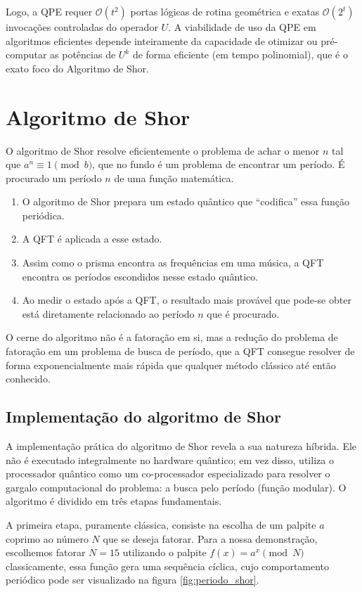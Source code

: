 \documentclass[12pt, a4paper]{article}
\begin{document}
Logo, a QPE requer $\mathcal{O}(t^2)$ portas lógicas de rotina geométrica e exatas $\mathcal{O}(2^t)$ invocações controladas do operador $U$. A viabilidade de uso da QPE em algoritmos eficientes depende inteiramente da capacidade de otimizar ou pré-computar as potências de $U^k$ de forma eficiente (em tempo polinomial), que é o exato foco do Algoritmo de Shor.

\section{Algoritmo de Shor}

O algoritmo de Shor resolve eficientemente o problema de achar o menor $n$ tal que $a^n \equiv 1 \pmod{b}$, que no fundo é um problema de encontrar um período. É procurado um período $n$ de uma função matemática.
\begin{enumerate}
    \item O algoritmo de Shor prepara um estado quântico que ``codifica'' essa função periódica. 
    \item A QFT é aplicada a esse estado.
    \item Assim como o prisma encontra as frequências em uma música, a QFT encontra os períodos escondidos nesse estado quântico.
    \item Ao medir o estado após a QFT, o resultado mais provável que pode-se obter está diretamente relacionado ao período $n$ que é procurado.
\end{enumerate}

O cerne do algoritmo não é a fatoração em si, mas a redução do problema de fatoração em um problema de busca de período, que a QFT consegue resolver de forma exponencialmente mais rápida que qualquer método clássico até então conhecido.

\subsection{Implementação do algoritmo de Shor}

A implementação prática do algoritmo de Shor revela a sua natureza híbrida. Ele não é executado integralmente no hardware quântico; em vez disso, utiliza o processador quântico como um co-processador especializado para resolver o gargalo computacional do problema: a busca pelo período (função modular). O algoritmo é dividido em três etapas fundamentais.

A primeira etapa, puramente clássica, consiste na escolha de um palpite $a$ coprimo ao número $N$ que se deseja fatorar. Para a nossa demonstração, escolhemos fatorar $N = 15$ utilizando o palpite $f(x) = a^x \pmod N$ classicamente, essa função gera uma sequência cíclica, cujo comportamento periódico pode ser visualizado na figura \ref{fig:periodo_shor}.
\end{document}
